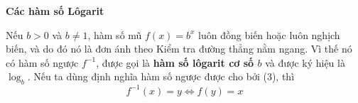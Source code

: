 \begin{minipage}[t]{0.708\textwidth}
    \vspace{1.2em}
    \noindent{\color{stewartcyan}\rule{1.1ex}{1.1ex}}\hspace{0.5em}\textbf{\textsf{\large Các hàm số Lôgarit}}

    \vspace{0.4em}
    Nếu $b > 0$ và $b \ne 1$, hàm số mũ $f(x) = b^x$ luôn đồng biến hoặc luôn nghịch biến, và do đó nó là đơn ánh theo Kiểm tra đường thẳng nằm ngang. Vì thế nó có hàm số ngược $f^{-1}$, được gọi là \textbf{hàm số lôgarit cơ số $b$} và được ký hiệu là $\log_b$. Nếu ta dùng định nghĩa hàm số ngược được cho bởi (3), thì
    \[
    f^{-1}(x) = y \iff f(y) = x
    \]
\end{minipage}